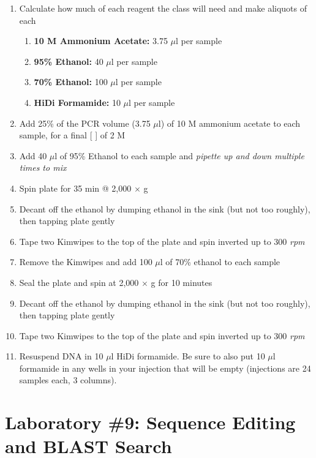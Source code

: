 \documentclass[12pt, hidelinks]{article}
\begin{document}
		\begin{enumerate}
			\item Calculate how much of each reagent the class will need and make aliquots of each
				\begin{enumerate}
					\item \textbf{10 M Ammonium Acetate:} 3.75 $\mu$l per sample
					\item \textbf{95\% Ethanol:} 40 $\mu$l per sample
					\item \textbf{70\% Ethanol:} 100 $\mu$l per sample
					\item \textbf{HiDi Formamide:} 10 $\mu$l per sample
				\end{enumerate}
			\item Add 25\% of the PCR volume (3.75 $\mu$l) of 10 M ammonium acetate to each sample, for a final [ ] of 2 M
			\item Add 40 $\mu$l of 95\% Ethanol to each sample and \emph{pipette up and down multiple times to mix}
			\item Spin plate for 35 min @ 2,000 $\times$ g
			\item Decant off the ethanol by dumping ethanol in the sink (but not too roughly), then tapping plate gently
			\item Tape two Kimwipes to the top of the plate and spin inverted up to 300 \emph{rpm}
			\item Remove the Kimwipes and add 100 $\mu$l of 70\% ethanol to each sample
			\item Seal the plate and spin at 2,000 $\times$ g for 10 minutes
			\item Decant off the ethanol by dumping ethanol in the sink (but not too roughly), then tapping plate gently
			\item Tape two Kimwipes to the top of the plate and spin inverted up to 300 \emph{rpm}
			\item Resuspend DNA in 10 $\mu$l HiDi formamide. Be sure to also put 10 $\mu$l formamide in any wells in your injection that will be empty (injections are 24 samples each, 3 columns).
		\end{enumerate}


\newpage
\section{Laboratory \#9: Sequence Editing and BLAST Search}


\end{document}

